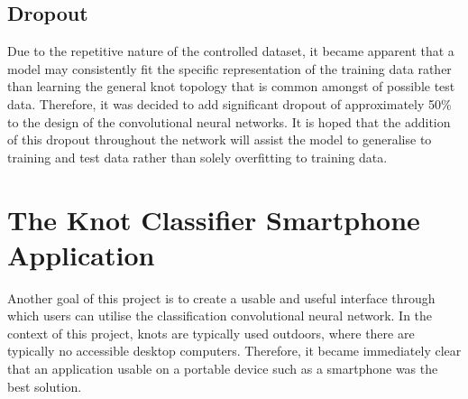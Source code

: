 \documentclass{l4proj}
\begin{document}
\subsection{Dropout}
Due to the repetitive nature of the controlled dataset, it became apparent that a model may consistently fit the specific representation of the training data rather than learning the general knot topology that is common amongst of possible test data.
Therefore, it was decided to add significant dropout of approximately 50\% to the design of the convolutional neural networks.
It is hoped that the addition of this dropout throughout the network will assist the model to generalise to training and test data rather than solely overfitting to training data. 

\section{The Knot Classifier Smartphone Application}
Another goal of this project is to create a usable and useful interface through which users can utilise the classification convolutional neural network.
In the context of this project, knots are typically used outdoors, where there are typically no accessible desktop computers.
Therefore, it became immediately clear that an application usable on a portable device such as a smartphone was the best solution.
\end{document}

